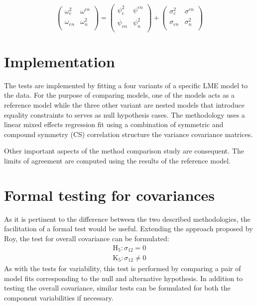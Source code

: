 \documentclass[12pt, a4paper]{report}
\theoremstyle{plain}
\theoremstyle{definition}
\theoremstyle{remark}
\begin{document}
	\begin{equation}
	\left( \begin{array}{cc}
	\omega^2_{e} & \omega^{en} \\
	\omega_{en} & \omega^2_{n} \\
	\end{array}\right)
	=
	\left( \begin{array}{cc}
	\psi^2_{e} & \psi^{en} \\
	\psi_{en} & \psi^2_{n} \\
	\end{array}\right)
	+
	\left( \begin{array}{cc}
	\sigma^2_{e} & \sigma^{en} \\
	\sigma_{en} & \sigma^2_{n} \\
	\end{array}\right)
	\end{equation}
	
	
	

\section{Implementation}
The tests are implemented by fitting a four variants of a specific LME model to the data. For the purpose of comparing models, one of the models acts as a reference model while the three other variant are nested models that introduce equality constraints to serves as null hypothesis cases. The methodology uses a linear mixed effects regression fit using a combination of symmetric and 
compound symmetry (CS) correlation structure the variance covariance matrices.

Other important aspects of the method comparison study are consequent. The limits of agreement are computed using the results of the reference model.






\section{Formal testing for covariances }
As it is pertinent to the difference between the two described methodologies, the facilitation of a formal test would be useful. Extending the approach proposed by Roy, the test for overall covariance can be formulated:
\begin{eqnarray*}
	\operatorname{H_5} : \sigma_{12} = 0 \\
	\operatorname{K_5} : \sigma_{12} \neq 0
\end{eqnarray*}
As with the tests for variability, this test is performed by comparing a pair of model fits corresponding to the null and alternative hypothesis. In addition to testing the overall covariance, similar tests can be formulated for both the component variabilities if necessary.
\end{document}
